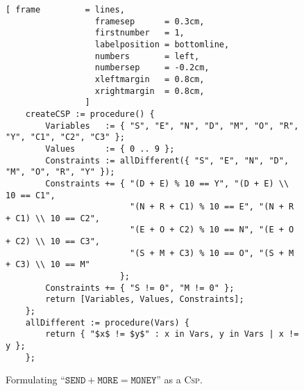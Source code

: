 \begin{figure}[!ht]
\centering
\begin{Verbatim}[ frame         = lines, 
                  framesep      = 0.3cm, 
                  firstnumber   = 1,
                  labelposition = bottomline,
                  numbers       = left,
                  numbersep     = -0.2cm,
                  xleftmargin   = 0.8cm,
                  xrightmargin  = 0.8cm,
                ]
    createCSP := procedure() {
        Variables   := { "S", "E", "N", "D", "M", "O", "R", "Y", "C1", "C2", "C3" };
        Values      := { 0 .. 9 };
        Constraints := allDifferent({ "S", "E", "N", "D", "M", "O", "R", "Y" });
        Constraints += { "(D + E) % 10 == Y", "(D + E) \\ 10 == C1",
                         "(N + R + C1) % 10 == E", "(N + R + C1) \\ 10 == C2",
                         "(E + O + C2) % 10 == N", "(E + O + C2) \\ 10 == C3",
                         "(S + M + C3) % 10 == O", "(S + M + C3) \\ 10 == M"
                       };
        Constraints += { "S != 0", "M != 0" };
        return [Variables, Values, Constraints];
    };
    allDifferent := procedure(Vars) {
        return { "$x$ != $y$" : x in Vars, y in Vars | x != y };
    };
\end{Verbatim}
\vspace*{-0.3cm}
\caption{Formulating ``$\mathtt{SEND} + \mathtt{MORE} = \mathtt{MONEY}$'' as a \textsc{Csp}.}
\label{fig:send-more-money.stlx}
\end{figure}

